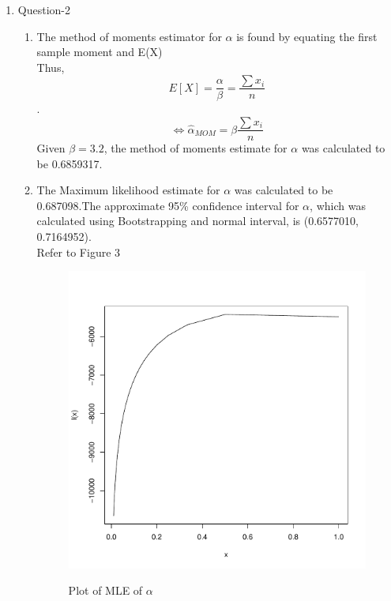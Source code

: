 \documentclass[11pt]{article}
\begin{document}
\begin{enumerate}
\item Question-2
\begin{enumerate}

\item The method of moments estimator for $\alpha$ is found by equating the first sample moment and E(X)\\
Thus,
			$$E[X]=\frac{\alpha}{\beta}=\frac{\sum{x_i}}{n}$$.
			$$\Leftrightarrow \hat{\alpha}_{MOM}=\beta\frac{\sum{x_i}}{n}$$
			Given $\beta=3.2$, the method of moments estimate for $\alpha$ was calculated to be 0.6859317.
\footnotemark 
			\\

\item  The Maximum likelihood estimate for $\alpha$ was calculated to be  0.687098.The approximate 95\% confidence interval for $\alpha$, which was calculated using Bootstrapping and normal interval, is (0.6577010, 0.7164952).\\
Refer to Figure 3
\footnotemark 
\begin{figure}[h]
	\caption[Figure 3]{Plot of MLE of $\alpha$}
    \centering
     \includegraphics[scale=0.4]{2bq.pdf}
      \label{fig3}			
\end{figure}\\



\end{enumerate}
\end{enumerate}
\end{document}
